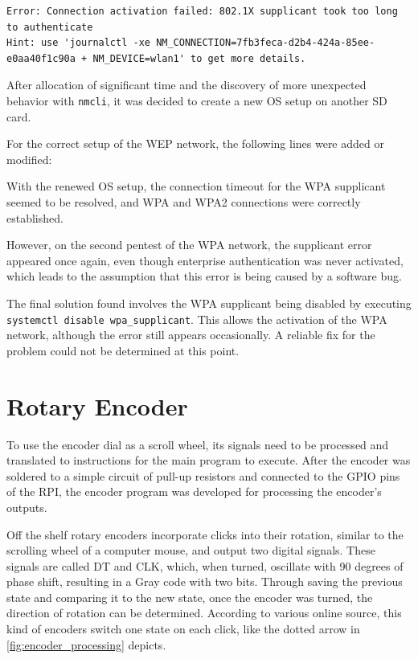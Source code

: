 \begin{lstlisting}[style=block, numbers=none]
Error: Connection activation failed: 802.1X supplicant took too long to authenticate 
Hint: use 'journalctl -xe NM_CONNECTION=7fb3feca-d2b4-424a-85ee-e0aa40f1c90a + NM_DEVICE=wlan1' to get more details.
\end{lstlisting}

After allocation of significant time and the discovery of more unexpected behavior with \lstinline[]|nmcli|, it was decided to create a new OS setup on another SD card.

For the correct setup of the WEP network, the following lines were added or modified:


With the renewed OS setup, the connection timeout for the WPA supplicant seemed to be resolved, and WPA and WPA2 connections were correctly established.

However, on the second pentest of the WPA network, the supplicant error appeared once again, even though enterprise authentication was never activated, which leads to the assumption that this error is being caused by a software bug.

The final solution found involves the WPA supplicant being disabled by executing
\\\lstinline[]|systemctl disable wpa_supplicant|.
This allows the activation of the WPA network, although the error still appears occasionally.
A reliable fix for the problem could not be determined at this point.

\section{Rotary Encoder}
To use the encoder dial as a scroll wheel, its signals need to be processed and translated to instructions for the main program to execute.
After the encoder was soldered to a simple circuit of pull-up resistors and connected to the GPIO pins of the RPI, the encoder program was developed for processing the encoder's outputs.

Off the shelf rotary encoders incorporate clicks into their rotation, similar to the scrolling wheel of a computer mouse, and output two digital signals.
These signals are called DT and CLK, which, when turned, oscillate with 90 degrees of phase shift, resulting in a Gray code with two bits.
Through saving the previous state and comparing it to the new state, once the encoder was turned, the direction of rotation can be determined.
According to various online source, this kind of encoders switch one state on each click, like the dotted arrow in \cref{fig:encoder_processing} depicts.

